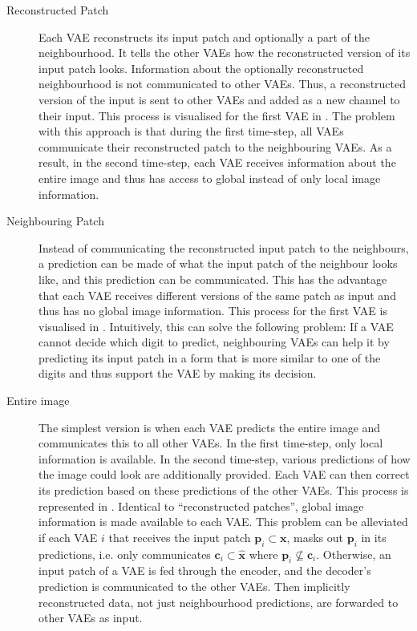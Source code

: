 \begin{description}
	\item [Reconstructed Patch] Each VAE reconstructs its input patch and optionally a part of the neighbourhood. It tells the other VAEs how the reconstructed version of its input patch looks. Information about the optionally reconstructed neighbourhood is not communicated to other VAEs. Thus, a reconstructed version of the input is sent to other VAEs and added as a new channel to their input. This process is visualised for the first VAE in . The problem with this approach is that during the first time-step, all VAEs communicate their reconstructed patch to the neighbouring VAEs. As a result, in the second time-step, each VAE receives information about the entire image and thus has access to global instead of only local image information.  
	\item [Neighbouring Patch] Instead of communicating the reconstructed input patch to the neighbours, a prediction can be made of what the input patch of the neighbour looks like, and this prediction can be communicated. This has the advantage that each VAE receives different versions of the same patch as input and thus has no global image information. This process for the first VAE is visualised in . Intuitively, this can solve the following problem: If a VAE cannot decide which digit to predict, neighbouring VAEs can help it by predicting its input patch in a form that is more similar to one of the digits and thus support the VAE by making its decision. 
	\item[Entire image] The simplest version is when each VAE predicts the entire image and communicates this to all other VAEs. In the first time-step, only local information is available. In the second time-step, various predictions of how the image could look are additionally provided. Each VAE can then correct its prediction based on these predictions of the other VAEs. This process is represented in . Identical to ``reconstructed patches'', global image information is made available to each VAE. This problem can be alleviated if each VAE $i$ that receives the input patch $\boldsymbol{p}_i \subset
 \boldsymbol{x}$, masks out $\boldsymbol{p}_i$ in its predictions, i.e. only communicates $\boldsymbol{c}_i \subset \boldsymbol{\hat{x}}$ where $\boldsymbol{p}_i \nsubseteq \boldsymbol{c}_i$. Otherwise, an input patch of a VAE is fed through the encoder, and the decoder's prediction is communicated to the other VAEs. Then implicitly reconstructed data, not just neighbourhood predictions, are forwarded to other VAEs as input. 
\end{description}












